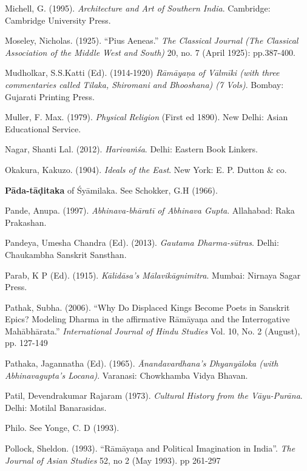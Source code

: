 \begin{thebibliography}{99}
Michell, G. (1995). {\sl Architecture and Art of Southern India}. Cambridge: Cambridge University Press.

Moseley, Nicholas. (1925). “Pius Aeneas.” {\sl The Classical Journal (The Classical Association of the Middle West and South)} 20, no. 7 (April 1925): pp.387-400.

Mudholkar, S.S.Katti (Ed). (1914-1920) {\sl Rāmāyaṇa of Vālmīki (with three commentaries called Tilaka,    Shiromani and Bhooshana) (7 Vols)}. Bombay: Gujarati Printing Press. 

Muller, F. Max. (1979). {\sl Physical Religion} (First ed 1890). New Delhi: Asian Educational Service. 

Nagar, Shanti Lal. (2012). {\sl Harivaṁśa}. Delhi: Eastern Book Linkers. 

Okakura, Kakuzo. (1904). {\sl Ideals of the East}. New York: E. P. Dutton \& co. 

{\bf Pāda-tāḍitaka} of Śyāmilaka. See Schokker, G.H (1966).

Pande, Anupa. (1997). {\sl Abhinava-bhāratī of Abhinava Gupta}. Allahabad: Raka Prakashan. 

Pandeya, Umesha Chandra (Ed). (2013). {\sl Gautama Dharma-sūtras}. Delhi: Chaukambha Sanskrit Sansthan. 

Parab, K P (Ed). (1915). {\sl Kālidāsa’s Mālavikāgnimitra}. Mumbai: Nirnaya Sagar Press. 

Pathak, Subha. (2006). “Why Do Displaced Kings Become Poets in Sanskrit Epics? Modeling Dharma in the affirmative Rāmāyaṇa and the Interrogative Mahābhārata.” {\sl International Journal of Hindu Studies} Vol. 10, No. 2 (August), pp. 127-149

Pathaka, Jagannatha (Ed). (1965). {\sl Ānandavardhana’s Dhyanyāloka (with Abhinavagupta’s Locana)}. Varanasi: Chowkhamba Vidya Bhavan. 

Patil, Devendrakumar Rajaram (1973). {\sl Cultural History from the Vāyu-Purāna}. Delhi: Motilal Banarasidas. 

Philo. See Yonge, C. D (1993).

Pollock, Sheldon. (1993). “Rāmāyaṇa and Political Imagination in India”. {\sl The Journal of Asian Studies} 52, no 2 (May 1993). pp 261-297


\end{thebibliography}
